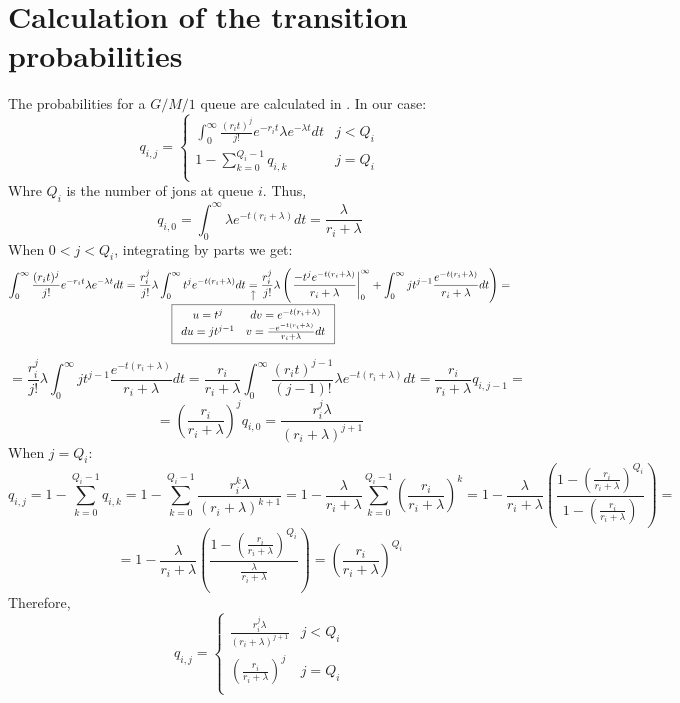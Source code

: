 \documentclass[a4paper,11pt]{article}
\newcommand{\nota}[3][2ex]{
    \underset{\mathclap{
        \begin{tikzpicture}
          \draw[->] (0, 0) to ++(0,#1);
          \node[below] at (0,0) {#3};
        \end{tikzpicture}}}{#2}
}
\begin{document}
\section*{Calculation of the transition probabilities}
The probabilities for a $G/M/1$ queue are calculated in \cite{ivo}. In our case:
$$
q_{i,j} = 
\left\{\begin{array}{ll}
    \displaystyle \int_0^\infty \frac{(r_i t)^j}{j!} e^{-r_i t} \lambda e^{-\lambda t} dt & j < Q_i \\
    \displaystyle 1- \sum_{k=0}^{Q_i -1} q_{i,k} & j = Q_i \\
\end{array}\right.
$$
Whre $Q_i$ is the number of jons at queue $i$. Thus,
$$
q_{i,0} = \int_0^\infty \lambda e^{-t(r_i + \lambda)} dt
=
\frac{\lambda}{r_i + \lambda}
$$
When $0<j<Q_i$, integrating by parts we get:
$$
\int_0^\infty \frac{(r_i t)^j}{j!} e^{-r_i t} \lambda e^{-\lambda t} dt
=
\frac{r_i^j}{j!} \lambda \int_0^\infty t^j e^{-t(r_i + \lambda)} dt
\nota{=}{$\boxed{\begin{array}{cc}
    u = t^j & dv = e^{-t(r_i+\lambda)} \\
    du = jt^{j-1} & v = \frac{- e^{-t(r_i+\lambda)}}{r_i+\lambda} dt \\
\end{array}}$}
\frac{r_i^j}{j!} \lambda \left( \left. \frac{-t^j e^{-t(r_i+\lambda)}}{r_i+\lambda} \right|_0^\infty + \int_0^\infty jt^{j-1} \frac{e^{-t(r_i+\lambda)}}{r_i+\lambda} dt \right) = 
$$
$$
=
\frac{r_i^j}{j!} \lambda \int_0^\infty jt^{j-1} \frac{e^{-t(r_i+\lambda)}}{r_i+\lambda} dt
=
\frac{r_i}{r_i + \lambda} \int_0^\infty \frac{(r_i t)^{j-1}}{(j-1)!} \lambda e^{-t(r_i + \lambda)} dt
=
\frac{r_i}{r_i + \lambda} q_{i,j-1}
=
$$
$$
=
\left( \frac{r_i}{r_i + \lambda} \right)^j q_{i,0}
=
\frac{r_i^j \lambda}{(r_i + \lambda)^{j+1}}
$$
When $j = Q_i$:
$$
q_{i, j}
=
1 - \sum_{k=0}^{Q_i -1} q_{i,k}
=
1 - \sum_{k=0}^{Q_i -1} \frac{r_i^k \lambda}{(r_i + \lambda)^{k+1}}
=
1 - \frac{\lambda}{r_i + \lambda} \sum_{k=0}^{Q_i -1} \left( \frac{r_i}{r_i + \lambda} \right)^k
=
1 - \frac{\lambda}{r_i + \lambda} \left( \frac{1- \left( \frac{r_i}{r_i + \lambda} \right)^{Q_i} }{1-\left( \frac{r_i}{r_i + \lambda} \right)} \right)
=
$$
$$
=
1 - \frac{\lambda}{r_i + \lambda} \left( \frac{1- \left( \frac{r_i}{r_i + \lambda} \right)^{Q_i}}{\frac{\lambda}{r_i + \lambda}} \right)
=
\left( \frac{r_i}{r_i + \lambda} \right)^{Q_i}
$$
Therefore,
$$
q_{i,j} = 
\left\{\begin{array}{ll}
    \displaystyle \frac{r_i^j \lambda}{(r_i + \lambda)^{j+1}} & j < Q_i \\
    \displaystyle \left( \frac{r_i}{r_i + \lambda} \right)^j & j = Q_i \\
\end{array}\right.
$$
\end{document}
